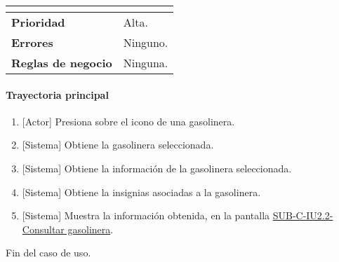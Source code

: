 \begin{longtable}{|J{5cm}|J{10.3cm}|}
\begin{itemize}
		\end{itemize} \\ \hline 
	\textbf{Prioridad} & 
		Alta. \\ \hline
	\textbf{Errores} & Ninguno.
		\\ \hline
	\textbf{Reglas de negocio} & Ninguna.
		 \\ \hline
\end{longtable}

\paragraph{Trayectoria principal}
	\begin{enumerate}
		\item {[Actor]} Presiona sobre el icono de una gasolinera.
		\item {[Sistema]} Obtiene la gasolinera seleccionada.
		\item {[Sistema]} Obtiene la información de la gasolinera seleccionada.
		\item {[Sistema]} Obtiene la insignias asociadas a la gasolinera.
		\item {[Sistema]} Muestra la información obtenida, en la pantalla \hyperref[fig:sub-c-iu2.2]{SUB-C-IU2.2-Consultar gasolinera}.
	\end{enumerate}
	Fin del caso de uso.

